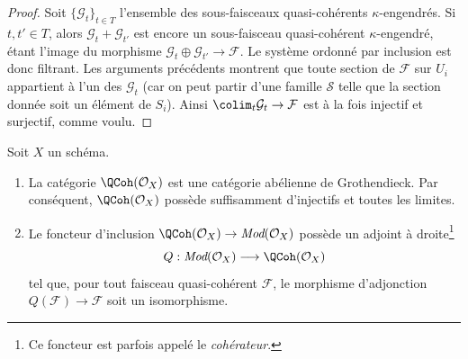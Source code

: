 \begin{proof}
\medskip\noindent
Soit $\{\mathcal{G}_t\}_{t \in T}$ l'ensemble des sous-faisceaux quasi-cohérents $\kappa$-engendrés.
Si $t, t' \in T$, alors
$\mathcal{G}_t + \mathcal{G}_{t'}$ est encore un sous-faisceau quasi-cohérent $\kappa$-engendré,
étant l'image du morphisme
$\mathcal{G}_t \oplus \mathcal{G}_{t'} \to \mathcal{F}$.
Le système ordonné par inclusion est donc filtrant. Les
arguments précédents montrent que toute section de $\mathcal{F}$ sur $U_i$
appartient à l'un des $\mathcal{G}_t$ (car on peut partir d'une famille $\mathcal{S}$
telle que la section donnée soit un élément de $S_i$). Ainsi
$\colim_t \mathcal{G}_t \to \mathcal{F}$ est à la fois injectif et surjectif,
comme voulu.
\end{proof}

\begin{proposition}
\label{proposition-coherator}
Soit $X$ un schéma.
\begin{enumerate}
\item La catégorie $\QCoh(\mathcal{O}_X)$ est une catégorie
abélienne de Grothendieck. Par conséquent, $\QCoh(\mathcal{O}_X)$
possède suffisamment d'injectifs et toutes les limites.
\item Le foncteur d'inclusion
$\QCoh(\mathcal{O}_X) \to \textit{Mod}(\mathcal{O}_X)$
possède un adjoint à droite\footnote{Ce foncteur est parfois appelé
le {\it cohérateur}.}
$$
Q : \textit{Mod}(\mathcal{O}_X) \longrightarrow \QCoh(\mathcal{O}_X)
$$
tel que, pour tout faisceau quasi-cohérent $\mathcal{F}$, le morphisme d'adjonction
$Q(\mathcal{F}) \to \mathcal{F}$ soit un isomorphisme.
\end{enumerate}
\end{proposition}


